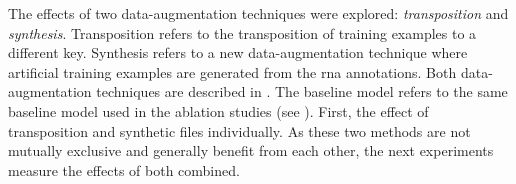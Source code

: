 
The effects of two data-augmentation techniques were
explored: \emph{transposition} and \emph{synthesis}.
Transposition refers to the transposition of training
examples to a different key. Synthesis refers to a new
data-augmentation technique where artificial training
examples are generated from the \gls{rna} annotations.
Both data-augmentation techniques are described in
. The baseline model refers to the
same baseline model used in the ablation studies (see
). First, the effect of
transposition and synthetic files individually. As these two
methods are not mutually exclusive and generally benefit
from each other, the next experiments measure the effects of
both combined. 
